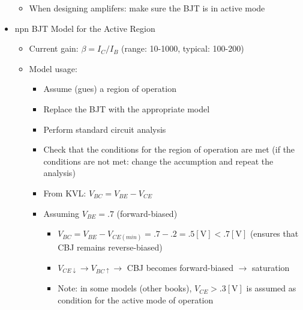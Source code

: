 \begin{itemize}
\begin{itemize}
      \item When designing amplifers: make sure the BJT is in active mode

    \end{itemize}

  \item npn BJT Model for the Active Region

    \begin{itemize}

      \item Current gain: $\beta=I_C/I_B$ (range: 10-1000, typical: 100-200)

      \item Model usage:

        \begin{itemize}

          \item Assume (gues) a region of operation

          \item Replace the BJT with the appropriate model

          \item Perform standard circuit analysis

          \item Check that the conditions for the region of operation are met (if the conditions are not met: change the accumption and repeat the analysis)

          \item From KVL: $V_{BC}=V_{BE}-V_{CE}$

          \item Assuming $V_{BE}=.7$ (forward-biased)

            \begin{itemize}

              \item $V_{BC}=V_{BE}-V_{CE(min)}=.7-.2=.5[\si{\volt}]<.7[\si{\volt}]$ (ensures that CBJ remains reverse-biased)

              \item $V_{CE\downarrow}\to V_{BC\uparrow} \to$ CBJ becomes forward-biased $\to$ saturation

              \item Note: in some models (other books), $V_{CE}>.3[\si{\volt}]$ is assumed as condition for the active mode of operation

            \end{itemize}

        \end{itemize}


\end{itemize}
\end{itemize}
